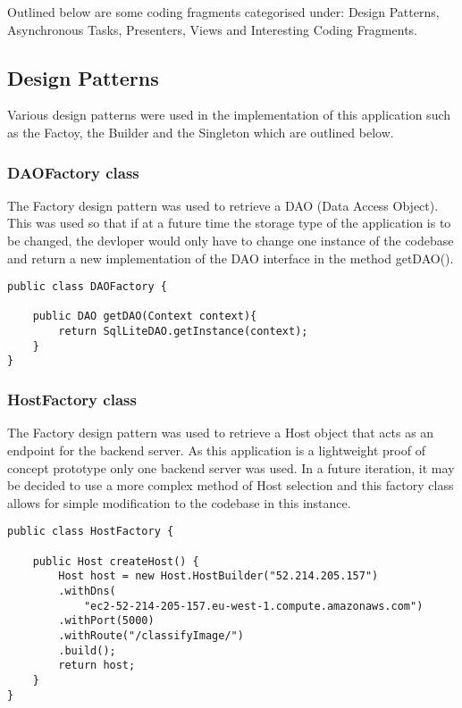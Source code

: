 Outlined below are some coding fragments categorised under: Design Patterns, Asynchronous Tasks, Presenters, Views and Interesting Coding Fragments.

\subsection*{Design Patterns}
Various design patterns were used in the implementation of this application such as the Factoy, the Builder and the Singleton which are outlined below.

\subsubsection*{DAOFactory class}
The Factory design pattern was used to retrieve a DAO (Data Access Object).
This was used so that if at a future time the storage type of the application is to be changed, the devloper would only have to change one instance of the codebase and return a new implementation of the DAO interface in the method getDAO().
\begin{lstlisting}[style=Java]
public class DAOFactory {

    public DAO getDAO(Context context){
        return SqlLiteDAO.getInstance(context);
    }
}
\end{lstlisting}

\subsubsection*{HostFactory class}
The Factory design pattern was used to retrieve a Host object that acts as an endpoint for the backend server.
As this application is a lightweight proof of concept prototype only one backend server was used.
In a future iteration, it may be decided to use a more complex method of Host selection and this factory class allows for simple modification to the codebase in this instance.
\begin{lstlisting}[style=Java]
public class HostFactory {

    public Host createHost() {
        Host host = new Host.HostBuilder("52.214.205.157")
        .withDns(
            "ec2-52-214-205-157.eu-west-1.compute.amazonaws.com")
        .withPort(5000)
        .withRoute("/classifyImage/")
        .build();
        return host;
    }
}
\end{lstlisting}


